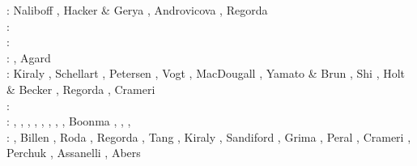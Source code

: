 \begin{scriptsize}
\twothousandthirteen: 
Naliboff \etal \cite{nabg13}, Hacker \& Gerya \cite{hage13}, Androvicova \etal \cite{ancv13},
\cite{namu13}\cite{yosh13}\cite{zhgt13}\cite{lixg13} 
\cite{jabr13}\cite{izht13}\cite{luws13}\cite{dusc13}\cite{tibb13}\cite{bubj13}\cite{scmo13} 
\cite{fuob13}\cite{magc13}\cite{musi13}\cite{mibg13}\cite{grpy13}\cite{vagd13a}\cite{vagd13b}
\cite{cavg13}\cite{vocg13}\cite{qula13}\cite{bugu13}\cite{myhi13}\cite{mesc13}\cite{cibi13}
\cite{scra13} Regorda \etal \cite{rems13}\\
\twothousandfourteen: 
\cite{robn14}\cite{hond14}\cite{ronc14}\cite{mobm14}\cite{famc14}\cite{fogm14}\cite{frba14} 
\cite{gagd14}\cite{voge14}\cite{voge14b}\cite{lidr14}\cite{bocj04}\cite{bagb14}\cite{stjm14}
\cite{basc14}\cite{vamd14}\cite{kile14}\cite{jahm14}\cite{bufa14}\cite{bufy14b}\cite{chsv14}
\cite{chsg14}\cite{sigb14}\cite{shjm14}\cite{mova14}\cite{olpr14}\cite{paml14b}\cite{mafv14}\\
\twothousandfifteen: 
\cite{bemm15}\cite{bomv15}\cite{bogf15}\cite{ceag15}\cite{kifr15}\cite{vami15}\cite{dali15}
\cite{mami15}\cite{rula15}\cite{chsd15}\cite{dusc15}\cite{yotr15}\cite{cibi15}\cite{hobb15}
\cite{carr15}\\
\twothousandsixteen: 
\cite{tomy16}\cite{gukt16}\cite{robn16}\cite{mavm16}\cite{magc16}\cite{marl16}\cite{mesj16}
\cite{jada16}\cite{jada16b}\cite{liku16}\cite{chss16}, Agard \etal \cite{agys16}\\
\twothousandseventeen: Kiraly \etal \cite{kicf17}, Schellart \cite{sche17}, 
                       Petersen \etal \cite{pest17}, Vogt \etal \cite{vomc17}, 
                       MacDougall \etal \cite{majf17}, Yamato \& Brun \cite{yabr17}, 
                       Shi \etal \cite{shwl17}, Holt \& Becker \cite{hobe17}, 
                       Regorda \etal \cite{rerm17}, Crameri \etal \cite{crlt17}\\
\twothousandeighteen: \cite{yamz18}\cite{crli18}
                      \cite{spcv18}\cite{chss18}
                      \cite{yagz18}\cite{mazh18}
                      \cite{pukp18}\cite{masg18}
                      \cite{biar18}\\
\twothousandnineteen: \cite{magn19}, \cite{mavb19},
                      \cite{scvm19}, \cite{cakc19},
                      \cite{samo19}, \cite{sihf19},
                      \cite{meag19}, \cite{vaws19}, 
                      Boonma \etal \cite{bokg19}, \cite{vawg19},
                      \cite{cibi19}, \cite{pust19}\\
\twothousandtwenty: \cite{algg20}\cite{braf20}
                    \cite{vamg20}\cite{dawl20}
                    \cite{meag20}\cite{bedh20}
                    \cite{heyg20}\cite{kicd20}
                    \cite{mugu20}\cite{gatt20}
                    \cite{pust20}, Billen \cite{bill20},
                    Roda \etal \cite{rozr20}, Regorda \etal \cite{relr20}, 
                    Tang \etal \cite{tacm20}, Kiraly \etal \cite{kiph20}, 
                    Sandiford \etal \cite{sams20}, Grima \etal \cite{grlc20}, 
                    Peral \etal \cite{perz20}, Crameri \etal \cite{crmd20}, 
                    Perchuk \etal \cite{pegz20}, Assanelli \etal \cite{aslr20}, 
                    Abers \etal \cite{abvw20} 
\end{scriptsize}

